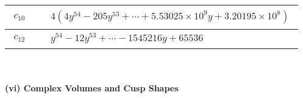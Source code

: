 \documentclass[1p]{elsarticle_modified}
\theoremstyle{definition}
\begin{document}
\begin{tabular}{m{50pt}|m{274pt}}
\hline $$\begin{aligned}c_{10}\end{aligned}$$&$\begin{aligned}
&4(4 y^{54}-205 y^{53}+\cdots+5.53025\times10^{9} y+3.20195\times10^{8})
\end{aligned}$\\
\hline $$\begin{aligned}c_{12}\end{aligned}$$&$\begin{aligned}
&y^{54}-12 y^{53}+\cdots-1545216 y+65536
\end{aligned}$\\
\hline
\end{tabular}\\~\\
\newpage\flushleft \textbf{(vi) Complex Volumes and Cusp Shapes}
\end{document}
